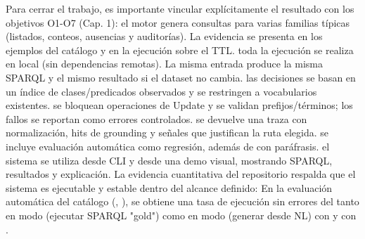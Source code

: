 {}Para cerrar el trabajo, es importante vincular explícitamente el resultado con los objetivos O1-O7 (Cap. 1):\markdownRendererInterblockSeparator
{}\markdownRendererUlBeginTight
\markdownRendererUlItem {} el motor genera consultas  para varias familias típicas (listados, conteos, ausencias y auditorías). La evidencia se presenta en los ejemplos del catálogo y en la ejecución sobre el TTL.\markdownRendererUlItemEnd 
\markdownRendererUlItem {} toda la ejecución se realiza en local (sin dependencias remotas). La misma entrada produce la misma SPARQL y el mismo resultado si el dataset no cambia.\markdownRendererUlItemEnd 
\markdownRendererUlItem {} las decisiones se basan en un índice de clases/predicados observados y se restringen a vocabularios existentes.\markdownRendererUlItemEnd 
\markdownRendererUlItem {} se bloquean operaciones de Update y se validan prefijos/términos; los fallos se reportan como errores controlados.\markdownRendererUlItemEnd 
\markdownRendererUlItem {} se devuelve una traza con normalización, hits de grounding y señales que justifican la ruta elegida.\markdownRendererUlItemEnd 
\markdownRendererUlItem {} se incluye evaluación automática como regresión, además de  con paráfrasis.\markdownRendererUlItemEnd 
\markdownRendererUlItem {} el sistema se utiliza desde CLI y desde una demo visual, mostrando SPARQL, resultados y explicación.\markdownRendererUlItemEnd 
\markdownRendererUlEndTight \markdownRendererInterblockSeparator
{} La evidencia cuantitativa del repositorio respalda que el sistema es ejecutable y estable dentro del alcance definido:\markdownRendererInterblockSeparator
{}\markdownRendererUlBeginTight
\markdownRendererUlItem En la evaluación automática del catálogo (, ), se obtiene una tasa de ejecución sin errores del  tanto en modo  (ejecutar SPARQL "gold") como en modo  (generar desde NL) con  y con .\markdownRendererUlItemEnd 
